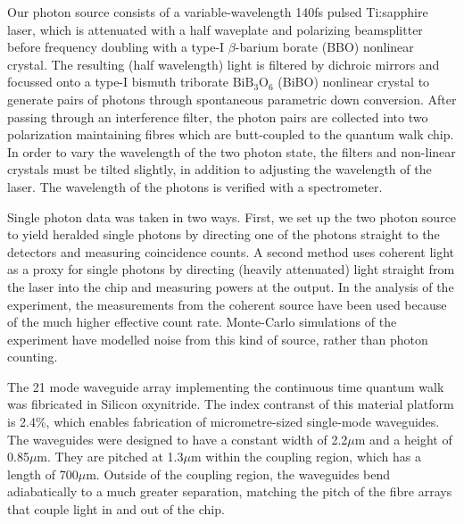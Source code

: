 Our photon source consists of a variable-wavelength 140fs pulsed Ti:sapphire
laser, which is attenuated with a half waveplate and polarizing beamsplitter
before frequency doubling with a type-I \(\beta\)-barium borate (BBO) nonlinear
crystal. The resulting (half wavelength) light is filtered by dichroic mirrors
and focussed onto a type-I bismuth triborate \(\text{BiB}_{3}\text{O}_{6}\)
(BiBO) nonlinear crystal to generate pairs of photons through spontaneous
parametric down conversion. After passing through an interference filter, the
photon pairs are collected into two polarization maintaining fibres which are
butt-coupled to the quantum walk chip. In order to vary the wavelength of the
two photon state, the filters and non-linear crystals must be tilted slightly,
in addition to adjusting the wavelength of the laser. The wavelength of the
photons is verified with a spectrometer.

Single photon data was taken in two ways. First, we set up the two photon source
to yield heralded single photons by directing one of the photons straight to the
detectors and measuring coincidence counts. A second method uses coherent light
as a proxy for single photons by directing (heavily attenuated) light straight
from the laser into the chip and measuring powers at the output. In the analysis
of the experiment, the measurements from the coherent source have been used
because of the much higher effective count rate. Monte-Carlo simulations of the
experiment have modelled noise from this kind of source, rather than photon
counting.

The 21 mode waveguide array implementing the continuous time quantum walk was
fibricated in Silicon oxynitride. The index contranst of this material platform
is 2.4\%, which enables fabrication of micrometre-sized single-mode waveguides.
The waveguides were designed to have a constant width of 2.2\(\mu\)m and a
height of 0.85\(\mu\)m. They are pitched at 1.3\(\mu\)m within the coupling
region, which has a length of 700\(\mu\)m. Outside of the coupling region, the
waveguides bend adiabatically to a much greater separation, matching the 
pitch of the fibre arrays that couple light in and out of the chip.

